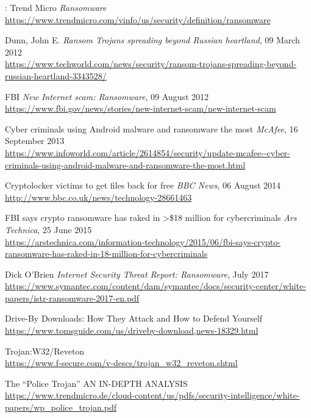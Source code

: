 \documentclass[10pt,a4paper]{article}
\begin{document}
\begin{thebibliography}{1}

:
Trend Micro
\textit{Ransomware}
\\\url{https://www.trendmicro.com/vinfo/us/security/definition/ransomware}

Dunn, John E.
\textit{Ransom Trojans spreading beyond Russian heartland}, 09 March 2012
\\\url{https://www.techworld.com/news/security/ransom-trojans-spreading-beyond-russian-heartland-3343528/}

FBI
\textit{New Internet scam: Ransomware}, 09 August 2012
\\\url{https://www.fbi.gov/news/stories/new-internet-scam/new-internet-scam}

Cyber criminals using Android malware and ransomware the most
\textit{McAfee}, 16 September 2013
\\\url{https://www.infoworld.com/article/2614854/security/update-mcafee--cyber-criminals-using-android-malware-and-ransomware-the-most.html}

Cryptolocker victims to get files back for free
\textit{BBC News}, 06 August 2014
\\\url{http://www.bbc.co.uk/news/technology-28661463}

FBI says crypto ransomware has raked in \textgreater\$18 million for cybercriminals
\textit{Ars Technica}, 25 June 2015
\\\url{https://arstechnica.com/information-technology/2015/06/fbi-says-crypto-ransomware-has-raked-in-18-million-for-cybercriminals}

Dick O’Brien
\textit{Internet Security Threat Report: Ransomware}, July 2017
\\\url{https://www.symantec.com/content/dam/symantec/docs/security-center/white-papers/istr-ransomware-2017-en.pdf}

Drive-By Downloads: How They Attack and How to Defend Yourself
\\\url{https://www.tomsguide.com/us/driveby-download,news-18329.html}

Trojan:W32/Reveton
\\\url{https://www.f-secure.com/v-descs/trojan_w32_reveton.shtml}

The “Police Trojan”
AN IN-DEPTH ANALYSIS
\\\url{https://www.trendmicro.de/cloud-content/us/pdfs/security-intelligence/white-papers/wp_police_trojan.pdf}


\end{thebibliography}
\end{document}
